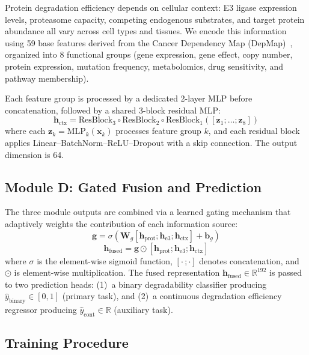 \documentclass[sigconf]{acmart}
\begin{document}
Protein degradation efficiency depends on cellular context: E3 ligase expression levels, proteasome capacity, competing endogenous substrates, and target protein abundance all vary across cell types and tissues.
We encode this information using 59 base features derived from the Cancer Dependency Map (DepMap)~\cite{tsherniak2017depmap}, organized into 8 functional groups (gene expression, gene effect, copy number, protein expression, mutation frequency, metabolomics, drug sensitivity, and pathway membership).

Each feature group is processed by a dedicated 2-layer MLP before concatenation, followed by a shared 3-block residual MLP:
\begin{equation}
    \mathbf{h}_{\text{ctx}} = \text{ResBlock}_3 \circ \text{ResBlock}_2 \circ \text{ResBlock}_1\!\left([\mathbf{z}_1; \ldots; \mathbf{z}_8]\right)
\end{equation}
where each $\mathbf{z}_k = \text{MLP}_k(\mathbf{x}_k)$ processes feature group $k$, and each residual block applies Linear--BatchNorm--ReLU--Dropout with a skip connection.
The output dimension is 64.

\subsection{Module D: Gated Fusion and Prediction}
\label{sec:fusion}

The three module outputs are combined via a learned gating mechanism that adaptively weights the contribution of each information source:
\begin{equation}
    \mathbf{g} = \sigma\!\left(\mathbf{W}_g [\mathbf{h}_{\text{prot}}; \mathbf{h}_{\text{e3}}; \mathbf{h}_{\text{ctx}}] + \mathbf{b}_g\right)
\end{equation}
\begin{equation}
    \mathbf{h}_{\text{fused}} = \mathbf{g} \odot [\mathbf{h}_{\text{prot}}; \mathbf{h}_{\text{e3}}; \mathbf{h}_{\text{ctx}}]
\end{equation}
where $\sigma$ is the element-wise sigmoid function, $[\cdot\,;\cdot]$ denotes concatenation, and $\odot$ is element-wise multiplication.
The fused representation $\mathbf{h}_{\text{fused}} \in \mathbb{R}^{192}$ is passed to two prediction heads: (1)~a binary degradability classifier producing $\hat{y}_{\text{binary}} \in [0,1]$ (primary task), and (2)~a continuous degradation efficiency regressor producing $\hat{y}_{\text{cont}} \in \mathbb{R}$ (auxiliary task).

\subsection{Training Procedure}
\label{sec:training}
\end{document}
